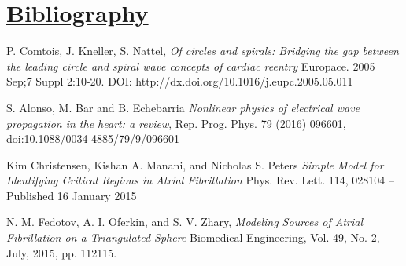 \documentclass[twocolumn, a1paper]{article}
\begin{document}
\section{\textbf{\underline{Bibliography}}}
\begin{thebibliography}{7}



P. Comtois, J. Kneller, S. Nattel,
\emph{Of circles and spirals: Bridging the gap between the leading circle and spiral wave concepts of cardiac reentry}
Europace. 2005 Sep;7 Suppl 2:10-20.
DOI: http://dx.doi.org/10.1016/j.eupc.2005.05.011



S. Alonso, M. Bar and B. Echebarria
\emph{Nonlinear physics of electrical wave
propagation in the heart: a review},
Rep. Prog. Phys. 79 (2016) 096601, 
doi:10.1088/0034-4885/79/9/096601

Kim Christensen, Kishan A. Manani, and Nicholas S. Peters
\emph{Simple Model for Identifying Critical Regions in Atrial Fibrillation}
Phys. Rev. Lett. 114, 028104 – Published 16 January 2015



N. M. Fedotov,  A. I. Oferkin, and S. V. Zhary,
\emph{Modeling Sources of Atrial Fibrillation on a Triangulated Sphere}
Biomedical Engineering, Vol. 49, No. 2, July, 2015, pp. 112115. 





\end{thebibliography}
\end{document}
